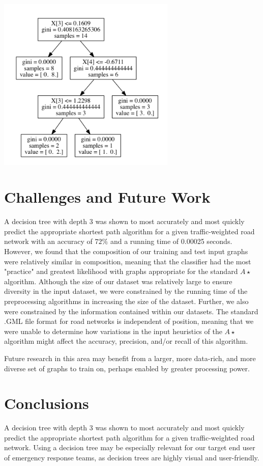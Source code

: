 \documentclass{article}
\begin{document}
\includegraphics[width=8.5cm]{dtree_vis}

\section{Challenges and Future Work}

A decision tree with depth 3 was shown to most accurately and most quickly predict the appropriate shortest path algorithm for a given traffic-weighted road network with an accuracy of $72\%$ and a running time of 0.00025 seconds. However, we found that the composition of our training and test input graphs were relatively similar in composition, meaning that the classifier had the most "practice" and greatest likelihood with graphs appropriate for the standard $A\star$ algorithm. Although the size of our dataset was relatively large to ensure diversity in the input dataset, we were constrained by the running time of the preprocessing algorithms in increasing the size of the dataset. Further, we also were constrained by the information contained within our datasets. The standard .GML file format for road networks is independent of position, meaning that we were unable to determine how variations in the input heuristics of the $A\star$ algorithm might affect the accuracy, precision, and/or recall of this algorithm.

Future research in this area may benefit from a larger, more data-rich, and more diverse set of graphs to train on, perhaps enabled by greater processing power.

\section{Conclusions}

A decision tree with depth 3 was shown to most accurately and most quickly predict the appropriate shortest path algorithm for a given traffic-weighted road network. Using a decision tree may be especially relevant for our target end user of emergency response teams, as decision trees are highly visual and user-friendly.



\end{document}
